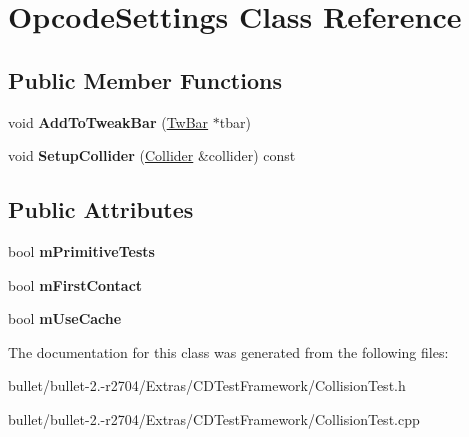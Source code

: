 \hypertarget{class_opcode_settings}{\section{Opcode\+Settings Class Reference}
\label{class_opcode_settings}
}
\subsection*{Public Member Functions}
\begin{DoxyCompactItemize}
\item 
\hypertarget{class_opcode_settings_a0383d77a4a2c7aac8cfbb978a316f045}{void {\bfseries Add\+To\+Tweak\+Bar} (\hyperlink{struct_c_tw_bar}{Tw\+Bar} $\ast$tbar)}\label{class_opcode_settings_a0383d77a4a2c7aac8cfbb978a316f045}

\item 
\hypertarget{class_opcode_settings_ab0d627e8d01bf851ccef6294d02f53b9}{void {\bfseries Setup\+Collider} (\hyperlink{class_collider}{Collider} \&collider) const }\label{class_opcode_settings_ab0d627e8d01bf851ccef6294d02f53b9}

\end{DoxyCompactItemize}
\subsection*{Public Attributes}
\begin{DoxyCompactItemize}
\item 
\hypertarget{class_opcode_settings_af5020977031d6dfd1058e9e5488cdb06}{bool {\bfseries m\+Primitive\+Tests}}\label{class_opcode_settings_af5020977031d6dfd1058e9e5488cdb06}

\item 
\hypertarget{class_opcode_settings_a3ce4c72c1072348b24bdb2d30cc1aa62}{bool {\bfseries m\+First\+Contact}}\label{class_opcode_settings_a3ce4c72c1072348b24bdb2d30cc1aa62}

\item 
\hypertarget{class_opcode_settings_aa7436937dd5af78432ca4dbefe84b77d}{bool {\bfseries m\+Use\+Cache}}\label{class_opcode_settings_aa7436937dd5af78432ca4dbefe84b77d}

\end{DoxyCompactItemize}


The documentation for this class was generated from the following files\+:\begin{DoxyCompactItemize}
\item 
bullet/bullet-\/2.-\/r2704/\+Extras/\+C\+D\+Test\+Framework/Collision\+Test.\+h\item 
bullet/bullet-\/2.-\/r2704/\+Extras/\+C\+D\+Test\+Framework/Collision\+Test.\+cpp\end{DoxyCompactItemize}
